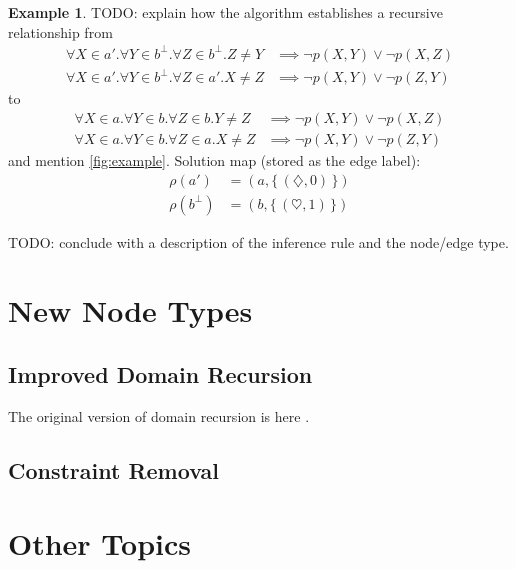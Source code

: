 \documentclass{article}
\theoremstyle{definition}
\newtheorem{example}{Example}
\begin{document}
\begin{example}
  TODO: explain how the algorithm establishes a recursive relationship from
  \begin{align*}
    \forall X \in a'. \forall Y \in b^\bot. \forall Z \in b^\bot. Z \ne Y &\implies \neg p(X, Y) \lor \neg p(X, Z) \\
    \forall X \in a'. \forall Y \in b^\bot. \forall Z \in a'. X \ne Z &\implies \neg p(X, Y) \lor \neg p(Z, Y)
  \end{align*}
  to
  \begin{align*}
    \forall X \in a. \forall Y \in b. \forall Z \in b. Y \ne Z &\implies \neg p(X, Y) \lor \neg p(X, Z) \\
    \forall X \in a. \forall Y \in b. \forall Z \in a. X \ne Z &\implies \neg p(X, Y) \lor \neg p(Z, Y)
  \end{align*}
  and mention \cref{fig:example}. Solution map (stored as the edge label):
  \begin{align*}
    \rho(a') &= (a, \{\, (\diamondsuit, 0) \,\}) \\
    \rho(b^\bot) &= (b, \{\, (\heartsuit, 1) \,\})
  \end{align*}
\end{example}

TODO: conclude with a description of the inference rule and the node/edge type.

\section{New Node Types}

\subsection{Improved Domain Recursion}

The original version of domain recursion is here \cite{DBLP:conf/nips/Broeck11}.

\subsection{Constraint Removal}

\section{Other Topics}
\end{document}
